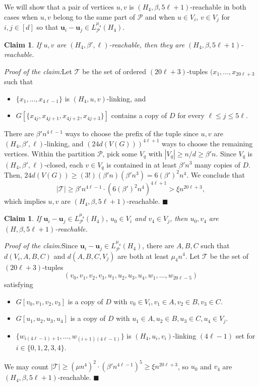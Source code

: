 \documentclass[11pt]{amsart}
\newtheorem{claim}[theorem]{Claim}
\newcommand{\CP}{\mathcal{P}}
\newcommand{\CT}{\mathcal{T}}
\newenvironment{claimproof}[1]{\par\noindent\textit{Proof of the claim:}\space#1}{\leavevmode\unskip\penalty9999 \hbox{}\nobreak\hfill\quad\hbox{$\blacksquare$}}
\begin{document}
We will show that a pair of vertices $u, v$ is $(H_4,\beta,5\ell+1)$-reachable in both cases when $u,v$ belong to the same part of $\CP$ and when $u\in V_i$, $v \in V_j$ for $i,j \in [d]$ so that $\mathbf{u}_i - \mathbf{u}_j \in L_\CP^{\mu_4}(H_4)$.
    
\begin{claim}
    If $u,v$ are $(H_4,\beta',\ell)$-reachable, then they are $(H_4,\beta,5\ell+1)$-reachable.
\end{claim}

\begin{claimproof}
    Let $\CT$ be the set of ordered $(20\ell+3)$-tuples $(x_1, \dots, x_{20\ell+3}$ such that 
    \begin{itemize}
        \item $\{x_1,\dots,x_{4\ell-1}\}$ is $(H_4,u,v)$-linking, and 
        \item $G[\{x_{4j},x_{4j+1},x_{4j+2},x_{4j+3}\}]$ contains a copy of $D$ for every $\ell \le j\le 5\ell$.
    \end{itemize}

    There are $\beta'n^{4\ell-1}$ ways to choose the prefix of the tuple since $u,v$ are $(H_4,\beta',\ell)$-linking, and $(24d(V(G)))^{4\ell+1}$ ways to choose the remaining vertices.
    Within the partition $\CP$, pick some $V_q$ with $|V_q|\ge n/d \ge \beta' n$.
    Since $V_q$ is $(H_4,\beta',\ell)$-closed, each $v\in V_q$ is contained in at least $\beta'n^3$ many copies of $D$.
    Then, $24d(V(G))\ge (3!)(\beta' n)(\beta'n^3)=6(\beta')^2n^4$.
    We conclude that 
    $$|\CT|\ge \beta'n^{4\ell-1}\cdot (6(\beta')^2n^4)^{4\ell+1} > \xi n^{20\ell+3},$$
    which implies $u, v$ are $(H_4,\beta,5\ell+1)$-reachable.
\end{claimproof}

\begin{claim}
    If $\mathbf{u}_i - \mathbf{u}_j \in L_\CP^{\mu_4}(H_4)$, $u_0\in V_i$ and $v_4\in V_j$, then $u_0,v_4$ are $(H,\beta,5\ell+1)$-reachable.
\end{claim}

\begin{claimproof}
    Since $\mathbf{u}_i - \mathbf{u}_j \in L_\CP^{\mu_4}(H_4)$, there are $A,B,C$ such that $d(V_i,A,B,C)$ and $d(A,B,C,V_j)$ are both at least $\mu_4 n^4$.
    Let $\CT$ be the set of $(20\ell+3)$-tuples
    $$(v_0,v_1,v_2,v_3,u_1,u_2,u_3,u_4,w_1,\dots,w_{20\ell-5})$$ satisfying
    \begin{itemize}
        \item $G[v_0,v_1,v_2,v_3]$ is a copy of $D$ with $v_0\in V_i,v_1\in A, v_2\in B, v_3\in C$.\;
        \item $G[u_1,u_2,u_3,u_4]$ is a copy of $D$ with $u_1\in A, u_2\in B, u_3\in C,u_4\in V_j$.\;
        \item $\{w_{i(4\ell-1)+1},\dots,w_{(i+1)(4\ell-1)}\}$ is $(H_4,u_i,v_i)$-linking $(4\ell-1)$ set for $i\in\{0,1,2,3,4\}$.
    \end{itemize}
    We may count $|\CT|\ge (\mu n^4)^2\cdot (\beta' n^{4\ell-1})^5\ge \xi n^{20\ell +3}$, so $u_0$ and $v_4$ are $(H_4,\beta,5\ell+1)$-reachable.
\end{claimproof}
\end{document}
